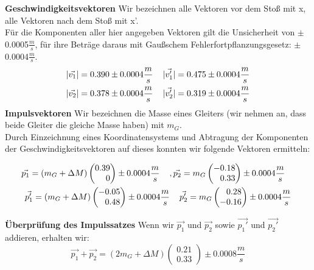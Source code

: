 \documentclass{article}
\begin{document}
\textbf{Geschwindigkeitsvektoren}
Wir bezeichnen alle Vektoren vor dem Stoß mit x, alle Vektoren nach dem Stoß mit x'. \\
Für die Komponenten aller hier angegeben Vektoren gilt die Unsicherheit von $\pm$0.0005$\frac{m}{s}$, für ihre Beträge daraus mit Gaußschem Fehlerfortpflanzungsgesetz: $\pm$0.0004$\frac{m}{s}$.
\begin{gather}
|\vec{v_1}|=0.390 \pm 0.0004 \frac{m}{s} \hspace{0.4cm}
|\vec{v_1'}|=0.475 \pm 0.0004 \frac{m}{s}
\\
|\vec{v_2}|=0.378 \pm 0.0004 \frac{m}{s} \hspace{0.4cm}
|\vec{v_2'}|=0.319 \pm 0.0004 \frac{m}{s}
\end{gather}
\textbf{Impulsvektoren}
Wir bezeichnen die Masse eines Gleiters (wir nehmen an, dass beide Gleiter die gleiche Masse haben) mit $m_G$. \\
Durch Einzeichnung eines Koordinatensystems und Abtragung der Komponenten der Geschwindigkeitsvektoren auf dieses konnten wir folgende Vektoren ermitteln:
\begin{center}


\begin{gather*}
\vec{p_1}=(m_G+\Delta M)
\begin{pmatrix*}[r]
0.39 \\ 0
\end{pmatrix*}\pm 0.0004 \frac{m}{s} \hspace{0.4cm}
, \vec{p_2}= 
m_G\begin{pmatrix*}[r]
-0.18 \\ 0.33
\end{pmatrix*}\pm 0.0004 \frac{m}{s}\hspace{0.4cm}
\\
\vec{p_1'}=
(m_G+\Delta M)\begin{pmatrix*}[r]
-0.05 \\ 0.48
\end{pmatrix*}\pm 0.0004  \frac{m}{s}\hspace{0.4cm}
\vec{p_2'}=m_G\begin{pmatrix*}[r]
0.28 \\ -0.16
\end{pmatrix*} \pm 0.0004 \frac{m}{s}
\end{gather*}
\end{center}
\textbf{Überprüfung des Impulssatzes}
Wenn wir $\vec{p_1}$ und $\vec{p_2}$ sowie $\vec{p_1'}$ und $\vec{p_2'}$ addieren, erhalten wir:
\begin{equation}\label{impuls1}
\vec{p_1}+\vec{p_2}=(2m_G+\Delta M )\begin{pmatrix}
0.21 \\ 0.33 
\end{pmatrix} \pm 0.0008  \frac{m}{s}
\end{equation}
\end{document}
